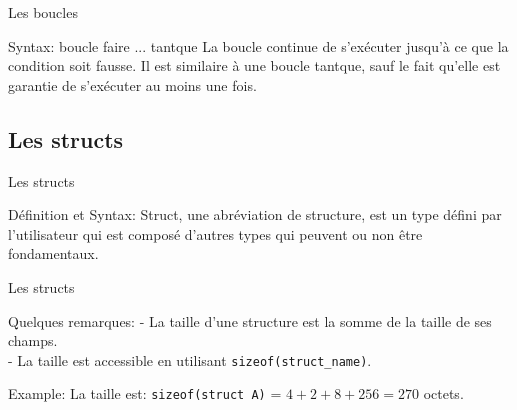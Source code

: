 \documentclass{beamer}
\begin{document}
\begin{darkframes}
	\begin{frame}{Les boucles}
		\begin{block}{Syntax: boucle faire ... tantque}
			\doWhileSyntax
			La boucle continue de s'exécuter jusqu'à ce que la condition soit \alert{fausse}. 
			Il est similaire à une boucle tantque, sauf le fait qu'elle est garantie de s'exécuter au moins une fois.
		\end{block}
	\end{frame}
	


  	\subsection{Les structs}
  	\begin{frame}{Les structs}
  		\begin{block}{Définition et Syntax:}
  			Struct, une abréviation de structure, est un type défini par l'utilisateur qui est composé d'autres types qui peuvent ou non être fondamentaux.
  			\structSyntax
  		\end{block}
  	\end{frame}
  
  	\begin{frame}{Les structs}
  		\begin{alertblock}{Quelques remarques:}
  			- La taille d'une structure est la somme de la taille de ses champs. \\
  			- La taille est accessible en utilisant \alert{\texttt{sizeof(struct\_name)}}.
  		\end{alertblock}
  		\begin{exampleblock}{Example:}
  			\structExmp
  			La taille est: \texttt{sizeof(struct A)} = $4 + 2 + 8 + 256 = 270$ octets.
  		\end{exampleblock}
  	\end{frame}
  

\end{darkframes}
\end{document}
